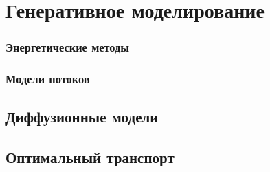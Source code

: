 \section{Генеративное моделирование}

\subsubsection{Энергетические методы}




\subsubsection{Модели потоков}


\subsection{Диффузионные модели}



\subsection{Оптимальный транспорт}





